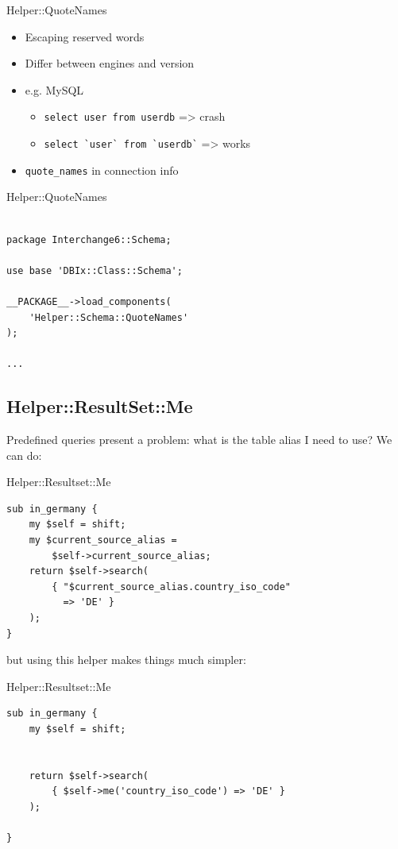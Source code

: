 \begin{frame}[fragile]{Helper::QuoteNames}
\begin{itemize}
\item Escaping reserved words
\item Differ between engines and version
\item e.g. MySQL
\begin{itemize}
\item \verb|select user from userdb| => crash
\item \verb|select `user` from `userdb`| => works
\end{itemize}
\item \verb|quote_names| in connection info
\end{itemize}
\end{frame}

\begin{frame}[fragile]{Helper::QuoteNames}
\begin{lstlisting}

package Interchange6::Schema;

use base 'DBIx::Class::Schema';

__PACKAGE__->load_components( 
    'Helper::Schema::QuoteNames' 
);

...

\end{lstlisting}
\end{frame}

\subsection{Helper::ResultSet::Me}

Predefined queries present a problem: what is the table alias I need to use?
We can do:

\begin{frame}[fragile]{Helper::Resultset::Me}
\begin{lstlisting}
sub in_germany {
    my $self = shift;
    my $current_source_alias =
        $self->current_source_alias;
    return $self->search(
        { "$current_source_alias.country_iso_code"
          => 'DE' }
    );
}
\end{lstlisting}
\end{frame}

but using this helper makes things much simpler:

\begin{frame}[fragile]{Helper::Resultset::Me}
\begin{lstlisting}
sub in_germany {
    my $self = shift;


    return $self->search(
        { $self->me('country_iso_code') => 'DE' }
    );

}
\end{lstlisting}
\end{frame}


